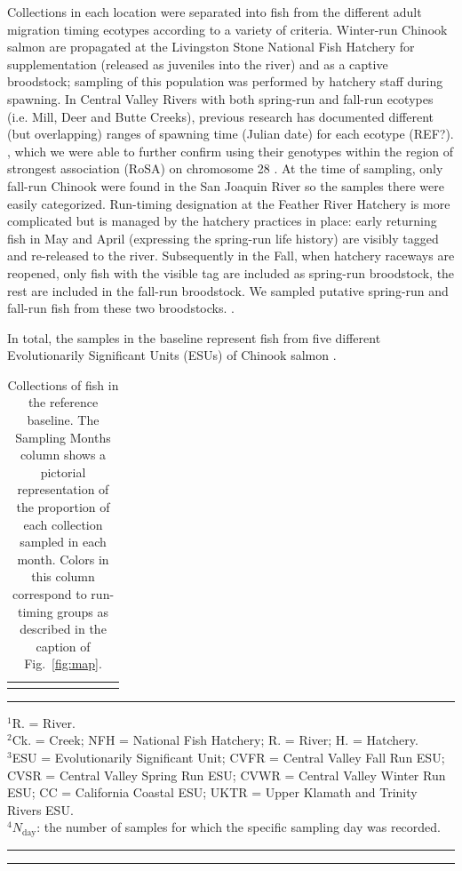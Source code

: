 Collections in each location were separated into fish from the different adult migration timing ecotypes according
to a variety of criteria.  Winter-run Chinook salmon are propagated at the Livingston
Stone National Fish Hatchery for supplementation (released as juveniles into the river) and as a captive broodstock;
sampling of this population was performed by hatchery staff during spawning. In Central Valley Rivers with both 
spring-run and fall-run ecotypes (i.e. Mill, Deer and Butte Creeks), previous research has documented different  (but overlapping) ranges of spawning time (Julian date) for each ecotype (REF?). , which we were able to further confirm using their genotypes
within the region of strongest association (RoSA) on chromosome 28 \citep{thompson2020complex}. At the time of sampling, only fall-run Chinook were found in the San Joaquin River so the samples there were
easily categorized. Run-timing 
designation at the Feather River Hatchery is more complicated but is managed by the hatchery practices in place: 
early returning fish in May and April (expressing the spring-run life history) are visibly tagged and re-released 
to the river. Subsequently in the Fall, when hatchery raceways are reopened, only fish with the visible tag are included
as spring-run broodstock, the rest are included in the fall-run broodstock. We sampled putative spring-run and fall-run fish from these two broodstocks.  .



In total, the samples in the baseline represent fish from five different Evolutionarily Significant 
Units (ESUs) of Chinook salmon \citep{waples1991pacific}.
\begin{table}
\caption{\footnotesize Collections of fish in the reference baseline.  The Sampling Months column shows
a pictorial representation of the proportion of each collection sampled in each month.  Colors in
this column correspond to run-timing groups as described in the caption of Fig.~\protect\ref{fig:map}.}
\label{tab:samples}
{\footnotesize 
\begin{tabular*}{\linewidth}{@{\extracolsep{\fill}} llllllrcr}
\hline\hline\vspace*{0.4ex}

\end{tabular*}
}
\rule{3cm}{0.3pt}

{\footnotesize
$^1$R. = River.\\
$^2$Ck. = Creek; NFH = National Fish Hatchery; R. = River; H. = Hatchery.\\
$^3$ESU = Evolutionarily Significant Unit; CVFR = Central Valley Fall Run ESU; CVSR = Central Valley Spring Run ESU; CVWR = 
Central Valley Winter Run ESU; CC = California Coastal ESU; UKTR = Upper Klamath and Trinity Rivers ESU. \\
$^4N_\mathrm{day}$: the number of samples for which the specific sampling day was recorded.
}
\hrule\vspace*{0.3ex}\hrule
\end{table}

